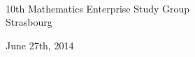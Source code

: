 \begin{frame}[c]


\begin{center}

\Large{}\\

\begin{center}
10th Mathematics Enterprise Study Group\\
Strasbourg
\end{center}

\bigskip
	\footnotesize\textcolor{brunfonce}{June 27th, 2014}
\end{center}

\end{frame}

%
%
%
%
%
%
